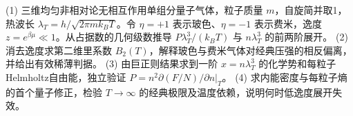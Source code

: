 (1) 三维均匀非相对论无相互作用单组分量子气体，粒子质量 \(m\)，自旋简并取1，热波长 \(\lambda_T=h/\sqrt{2\pi mk_BT}\)。令 \(\eta=+1\) 表示玻色、\(\eta=-1\) 表示费米，逸度 \(z=e^{\beta\mu}\ll1\)。从占据数的几何级数推导 \(P\lambda_T^3/(k_BT)\) 与 \(n\lambda_T^3\) 的前两阶展开。
(2) 消去逸度求第二维里系数 \(B_2(T)\)，解释玻色与费米气体对经典压强的相反偏离，并给出有效稀薄判据。
(3) 由巨正则结果求到一阶 \(x=n\lambda_T^3\) 的化学势和每粒子Helmholtz自由能，独立验证 \(P=n^2\partial(F/N)/\partial n|_T\)。
(4) 求内能密度与每粒子熵的首个量子修正，检验 \(T\to\infty\) 的经典极限及温度依赖，说明何时低逸度展开失效。
